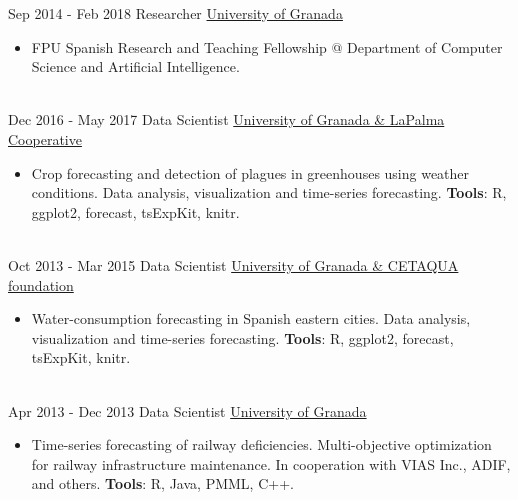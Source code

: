 \documentclass[letterpaper]{twentysecondcv} %
\begin{document}
\begin{twenty} %

\twentyitem
    	{Sep 2014 -}
		{Feb 2018}
        {Researcher}
        {\href{http://www.ugr.es/}{University of Granada}}
        {}
        {\begin{itemize}
        \item FPU Spanish Research and Teaching Fellowship @ Department of
Computer Science and Artificial Intelligence.
        \end{itemize}}
        \\
 \twentyitem
    	{Dec 2016 -}
		{May 2017}
        {Data Scientist}
        {\href{http://www.granadalapalma.com/}{University of Granada \& LaPalma Cooperative}}
        {}
        {\begin{itemize}
        	\item Crop forecasting and detection of plagues in greenhouses using weather conditions. Data analysis, visualization and time-series forecasting. \textbf{Tools}: R, ggplot2, forecast, tsExpKit, knitr.
        \end{itemize}}
        
\\
 \twentyitem
    	{Oct 2013 -}
		{Mar 2015}
        {Data Scientist}
        {\href{http://www.cetaqua.com/en/cetaqua}{University of Granada \& CETAQUA foundation}}
        {}
        {\begin{itemize}
        	\item Water-consumption forecasting in Spanish eastern cities. Data analysis, visualization and time-series forecasting. \textbf{Tools}: R, ggplot2, forecast, tsExpKit, knitr.
        \end{itemize}}
        
\\
        
	  \twentyitem
    	{Apr 2013 -}
		{Dec 2013}
        {Data Scientist}
        {\href{https://www.ugr.es/}{University of Granada}}
        {}
        {\begin{itemize}
        	\item Time-series forecasting of railway deficiencies. Multi-objective optimization for railway infrastructure maintenance. In cooperation with VIAS Inc., ADIF, and others.
        	\textbf{Tools}: R, Java, PMML, C++.
        \end{itemize}}
        

\end{twenty}
\end{document}
